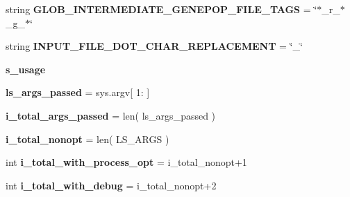 \begin{DoxyCompactItemize}
\item 
string {\bfseries G\+L\+O\+B\+\_\+\+I\+N\+T\+E\+R\+M\+E\+D\+I\+A\+T\+E\+\_\+\+G\+E\+N\+E\+P\+O\+P\+\_\+\+F\+I\+L\+E\+\_\+\+T\+A\+GS} = \char`\"{}$\ast$\+\_\+r\+\_\+$\ast$\+\_\+g\+\_\+$\ast$\char`\"{}\hypertarget{namespacenegui_1_1pgdriveneestimator_a1bb977fffd730588ade2008f702d6110}{}\label{namespacenegui_1_1pgdriveneestimator_a1bb977fffd730588ade2008f702d6110}

\item 
string {\bfseries I\+N\+P\+U\+T\+\_\+\+F\+I\+L\+E\+\_\+\+D\+O\+T\+\_\+\+C\+H\+A\+R\+\_\+\+R\+E\+P\+L\+A\+C\+E\+M\+E\+NT} = \char`\"{}\+\_\+\char`\"{}\hypertarget{namespacenegui_1_1pgdriveneestimator_ae33783002cdab9bc1d96f7cfe99a0ec9}{}\label{namespacenegui_1_1pgdriveneestimator_ae33783002cdab9bc1d96f7cfe99a0ec9}

\item 
{\bfseries s\+\_\+usage}
\item 
{\bfseries ls\+\_\+args\+\_\+passed} = sys.\+argv\mbox{[} 1\+: \mbox{]}\hypertarget{namespacenegui_1_1pgdriveneestimator_ad3cf21db0cb237a123d35cc33f27a235}{}\label{namespacenegui_1_1pgdriveneestimator_ad3cf21db0cb237a123d35cc33f27a235}

\item 
{\bfseries i\+\_\+total\+\_\+args\+\_\+passed} = len( ls\+\_\+args\+\_\+passed )\hypertarget{namespacenegui_1_1pgdriveneestimator_adc41d942a498e8128e501a4a31b3b7cf}{}\label{namespacenegui_1_1pgdriveneestimator_adc41d942a498e8128e501a4a31b3b7cf}

\item 
{\bfseries i\+\_\+total\+\_\+nonopt} = len( L\+S\+\_\+\+A\+R\+GS )\hypertarget{namespacenegui_1_1pgdriveneestimator_aa4e6982ff99236ac13e0af4c4d6e8839}{}\label{namespacenegui_1_1pgdriveneestimator_aa4e6982ff99236ac13e0af4c4d6e8839}

\item 
int {\bfseries i\+\_\+total\+\_\+with\+\_\+process\+\_\+opt} = i\+\_\+total\+\_\+nonopt+1\hypertarget{namespacenegui_1_1pgdriveneestimator_a94c82961d29b7470ac2fab07c882ea51}{}\label{namespacenegui_1_1pgdriveneestimator_a94c82961d29b7470ac2fab07c882ea51}

\item 
int {\bfseries i\+\_\+total\+\_\+with\+\_\+debug} = i\+\_\+total\+\_\+nonopt+2\hypertarget{namespacenegui_1_1pgdriveneestimator_a016de539b454a69f16a92dd281f1e59d}{}\label{namespacenegui_1_1pgdriveneestimator_a016de539b454a69f16a92dd281f1e59d}

\end{DoxyCompactItemize}


